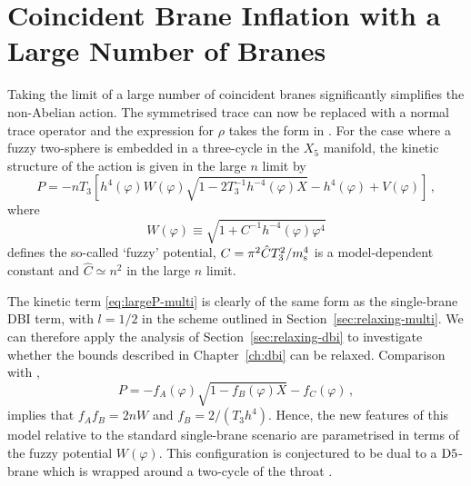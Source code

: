 \section{Coincident Brane Inflation with a Large Number of Branes}
\label{sec:twlargen-multi}
Taking the limit of a large number of coincident branes significantly
simplifies the non-Abelian action. The symmetrised trace can
now be replaced with a normal trace operator and the expression for $\rho$
takes the form in . 
% 
 For the case where a fuzzy two-sphere is 
embedded in a three-cycle in the $X_5$ manifold, 
the kinetic structure of the action is given in the large $n$ limit by 
\cite{thomasward}
% 
\begin{equation}
\label{eq:largeP-multi}
P=-nT_3 \left[ h^4(\varphi ) W(\varphi ) 
\sqrt{1-2 T_3^{-1} h^{-4}(\varphi) X}
-h^4(\varphi ) + V (\varphi ) \right] \,,
\end{equation}
% 
where
%    
\begin{equation} 
\label{eq:defW}
W (\varphi ) \equiv \sqrt{1+ C^{-1}h^{-4}(\varphi ) \varphi^4}
\end{equation}
% 
defines the so-called `fuzzy' potential, 
$C = \pi^2 \hat{C}T_3^2/m_\mathrm{s}^4$ is a model-dependent constant and 
$\hat{C} \simeq n^2$ in the large $n$ limit. 

The kinetic term \eqref{eq:largeP-multi} is clearly of the same form as the
single-brane DBI term, with $l=1/2$ in the scheme outlined in
Section~\ref{sec:relaxing-multi}. We can therefore apply the analysis of
Section~\ref{sec:relaxing-dbi} to investigate whether the bounds described in
Chapter~\ref{ch:dbi} can be relaxed.
Comparison with ,
% 
\begin{equation}
\label{eq:genaction-multi}
P= -f_A (\varphi ) \sqrt{1-f_B (\varphi ) X} -f_C (\varphi) \,,
\end{equation}
% 
implies that $f_Af_B =2nW$ and $f_B=2/(T_3h^4)$. Hence, 
the new features of this model relative to the standard single-brane 
scenario are parametrised in terms of the fuzzy potential $W (\varphi )$. 
This configuration is conjectured to be dual to 
a ${\rm D5}$-brane which is wrapped around a two-cycle 
of the throat \cite{dual1,dual2,dual3}. 

